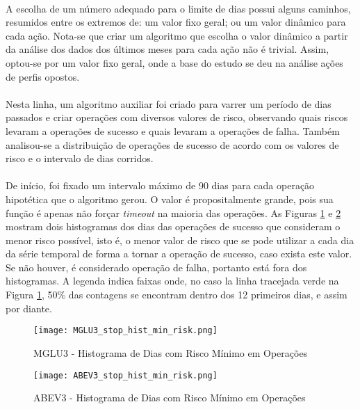 \paragraph{} A escolha de um número adequado para o limite de dias possui alguns caminhos, resumidos entre os extremos de: um valor fixo geral; ou um valor dinâmico para cada ação. Nota-se que criar um algoritmo que escolha o valor dinâmico a partir da análise dos dados dos últimos meses para cada ação não é trivial. Assim, optou-se por um valor fixo geral, onde a base do estudo se deu na análise ações de perfis opostos.

\paragraph{} Nesta linha, um algoritmo auxiliar foi criado para varrer um período de dias passados e criar operações com diversos valores de risco, observando quais riscos levaram a operações de sucesso e quais levaram a operações de falha. Também analisou-se a distribuição de operações de sucesso de acordo com os valores de risco e o intervalo de dias corridos.

\paragraph{} De início, foi fixado um intervalo máximo de 90 dias para cada operação hipotética que o algoritmo gerou. O valor é propositalmente grande, pois sua função é apenas não forçar \textit{timeout} na maioria das operações. As Figuras \ref{fig:120} e \ref{fig:121} mostram dois histogramas dos dias das operações de sucesso que consideram o menor risco possível, isto é, o menor valor de risco que se pode utilizar a cada dia da série temporal de forma a tornar a operação de sucesso, caso exista este valor. Se não houver, é considerado operação de falha, portanto está fora dos histogramas. A legenda indica faixas onde, no caso la linha tracejada verde na Figura \ref{fig:120}, 50\% das contagens se encontram dentro dos 12 primeiros dias, e assim por diante.

\begin{figure}[h]
    \texttt{[image: MGLU3\_stop\_hist\_min\_risk.png]}
    \centering
    \caption{MGLU3 - Histograma de Dias com Risco Mínimo em Operações}
    \label{fig:120}
\end{figure}

\begin{figure}[h]
    \texttt{[image: ABEV3\_stop\_hist\_min\_risk.png]}
    \centering
    \caption{ABEV3 - Histograma de Dias com Risco Mínimo em Operações}
    \label{fig:121}
\end{figure}

